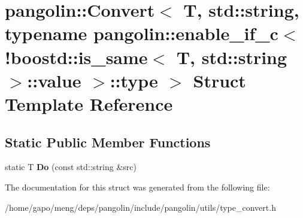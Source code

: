 \hypertarget{structpangolin_1_1_convert_3_01_t_00_01std_1_1string_00_01typename_01pangolin_1_1enable__if__c_3e41c835b953ae45734366e409b5e4a53}{}\section{pangolin\+:\+:Convert$<$ T, std\+:\+:string, typename pangolin\+:\+:enable\+\_\+if\+\_\+c$<$ !boostd\+:\+:is\+\_\+same$<$ T, std\+:\+:string $>$\+:\+:value $>$\+:\+:type $>$ Struct Template Reference}
\label{structpangolin_1_1_convert_3_01_t_00_01std_1_1string_00_01typename_01pangolin_1_1enable__if__c_3e41c835b953ae45734366e409b5e4a53}
\subsection*{Static Public Member Functions}
\begin{DoxyCompactItemize}
\item 
static T {\bfseries Do} (const std\+::string \&src)\hypertarget{structpangolin_1_1_convert_3_01_t_00_01std_1_1string_00_01typename_01pangolin_1_1enable__if__c_3e41c835b953ae45734366e409b5e4a53_a688918fe5783fa4c0e2c1abe70fdd967}{}\label{structpangolin_1_1_convert_3_01_t_00_01std_1_1string_00_01typename_01pangolin_1_1enable__if__c_3e41c835b953ae45734366e409b5e4a53_a688918fe5783fa4c0e2c1abe70fdd967}

\end{DoxyCompactItemize}


The documentation for this struct was generated from the following file\+:\begin{DoxyCompactItemize}
\item 
/home/gapo/meng/deps/pangolin/include/pangolin/utils/type\+\_\+convert.\+h\end{DoxyCompactItemize}
